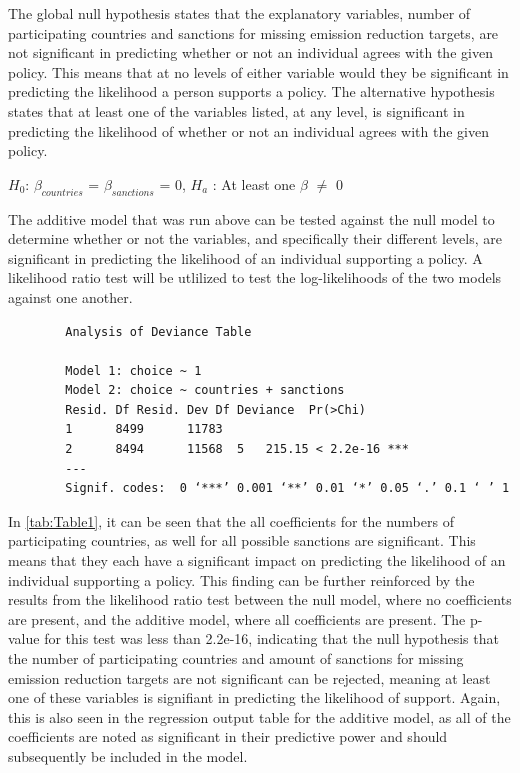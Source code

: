 \documentclass[12pt,letterpaper]{article}
\begin{document}
\begin{enumerate}
	\noindent The global null hypothesis states that the explanatory variables, number of participating countries and sanctions for missing emission reduction targets, are not significant in predicting whether or not an individual agrees with the given policy. This means that at no levels of either variable would they be significant in predicting the likelihood a person supports a policy. The alternative hypothesis states that at least one of the variables listed, at any level, is significant in predicting the likelihood of whether or not an individual agrees with the given policy. 
	
	$H_{0}$: $\beta_{countries}$ = $\beta_{sanctions}$ = 0, $H_{a}$ : At least one $\beta$ $\neq$ 0
	
	\noindent The additive model that was run above can be tested against the null model to determine whether or not the variables, and specifically their different levels, are significant in predicting the likelihood of an individual supporting a policy. A likelihood ratio test will be utlilized to test the log-likelihoods of the two models against one another.
	
	
	
	\begin{verbatim}
		Analysis of Deviance Table
		
		Model 1: choice ~ 1
		Model 2: choice ~ countries + sanctions
		Resid. Df Resid. Dev Df Deviance  Pr(>Chi)    
		1      8499      11783                          
		2      8494      11568  5   215.15 < 2.2e-16 ***
		---
		Signif. codes:  0 ‘***’ 0.001 ‘**’ 0.01 ‘*’ 0.05 ‘.’ 0.1 ‘ ’ 1
	\end{verbatim}

	\noindent In \autoref{tab:Table1}, it can be seen that the all coefficients for the numbers of participating countries, as well for all possible sanctions are significant. This means that they each have a significant impact on predicting the likelihood of an individual supporting a policy. This finding can be further reinforced by the results from the likelihood ratio test between the null model, where no coefficients are present, and the additive model, where all coefficients are present. The p-value for this test was less than 2.2e-16, indicating that the null hypothesis that the number of participating countries and amount of sanctions for missing emission reduction targets are not significant can be rejected, meaning at least one of these variables is signifiant in predicting the likelihood of support. Again, this is also seen in the regression output table for the additive model, as all of the coefficients are noted as significant in their predictive power and should subsequently be included in the model. 
	\vspace{1cm}
	


\end{enumerate}
\end{document}
